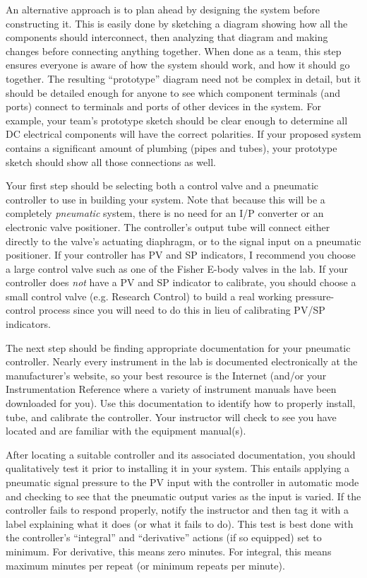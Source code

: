 An alternative approach is to plan ahead by designing the system before constructing it.  This is easily done by sketching a diagram showing how all the components should interconnect, then analyzing that diagram and making changes before connecting anything together.  When done as a team, this step ensures everyone is aware of how the system should work, and how it should go together.  The resulting ``prototype'' diagram need not be complex in detail, but it should be detailed enough for anyone to see which component terminals (and ports) connect to terminals and ports of other devices in the system.  For example, your team's prototype sketch should be clear enough to determine all DC electrical components will have the correct polarities.  If your proposed system contains a significant amount of plumbing (pipes and tubes), your prototype sketch should show all those connections as well.

\vskip 10pt

Your first step should be selecting both a control valve and a pneumatic controller to use in building your system.  Note that because this will be a completely {\it pneumatic} system, there is no need for an I/P converter or an electronic valve positioner.  The controller's output tube will connect either directly to the valve's actuating diaphragm, or to the signal input on a pneumatic positioner.  If your controller has PV and SP indicators, I recommend you choose a large control valve such as one of the Fisher E-body valves in the lab.  If your controller does {\it not} have a PV and SP indicator to calibrate, you should choose a small control valve (e.g. Research Control) to build a real working pressure-control process since you will need to do this in lieu of calibrating PV/SP indicators.

The next step should be finding appropriate documentation for your pneumatic controller.  Nearly every instrument in the lab is documented electronically at the manufacturer's website, so your best resource is the Internet (and/or your Instrumentation Reference where a variety of instrument manuals have been downloaded for you).  Use this documentation to identify how to properly install, tube, and calibrate the controller.  Your instructor will check to see you have located and are familiar with the equipment manual(s).

After locating a suitable controller and its associated documentation, you should qualitatively test it prior to installing it in your system.  This entails applying a pneumatic signal pressure to the PV input with the controller in automatic mode and checking to see that the pneumatic output varies as the input is varied.  If the controller fails to respond properly, notify the instructor and then tag it with a label explaining what it does (or what it fails to do).  This test is best done with the controller's ``integral'' and ``derivative'' actions (if so equipped) set to minimum.  For derivative, this means zero minutes.  For integral, this means maximum minutes per repeat (or minimum repeats per minute).  

